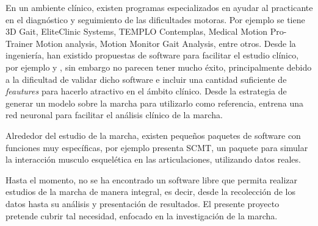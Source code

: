 En un ambiente clínico, existen programas especializados en ayudar al practicante en el diagnóstico y seguimiento de las dificultades motoras. Por ejemplo se tiene 3D Gait, EliteClinic Systems, TEMPLO Contemplas, Medical Motion Pro-Trainer Motion analysis, Motion Monitor Gait Analysis, entre otros. Desde la ingeniería, han existido propuestas de software para facilitar el estudio clínico, por ejemplo \cite{hayla} y \cite{senanayake}, sin embargo no parecen tener mucho éxito, principalmente debido a la dificultad de validar dicho software e incluir una cantidad suficiente de \emph{feautures} para hacerlo atractivo en el ámbito clínico. Desde la estrategia de generar un modelo sobre la marcha para utilizarlo como referencia, \cite{vieira} entrena una red neuronal para facilitar el análisis clínico de la marcha.

Alrededor del estudio de la marcha, existen pequeños paquetes de software con funciones muy específicas, por ejemplo \cite{eskinazi} presenta SCMT, un paquete para simular la interacción musculo esquelética en las articulaciones, utilizando datos reales.

Hasta el momento, no se ha encontrado un software libre que permita realizar estudios de la marcha de manera integral, es decir, desde la recolección de los datos hasta su análisis y presentación de resultados. El presente proyecto pretende cubrir tal necesidad, enfocado en la investigación de la marcha.  


